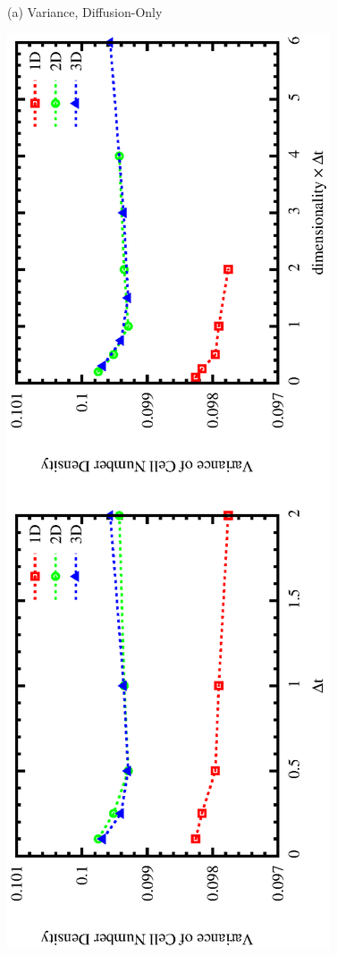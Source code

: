 \documentclass{article}
\begin{document}
\begin{figure}
\begin{center}
\\
\vspace{5mm}
(a) Variance, Diffusion-Only
\vspace{-5mm}
\end{center}
\includegraphics[angle=270,width=\linewidth]{fig1/var_diff.eps}

\end{figure}
\end{document}
